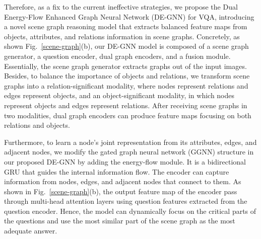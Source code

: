 \documentclass[letterpaper]{article} %
\begin{document}

Therefore, as a fix to the current ineffective strategies, we propose the Dual Energy-Flow Enhanced Graph Neural Network (DE-GNN) for VQA, introducing a novel scene graph reasoning model that extracts balanced feature maps from objects, attributes, and relations information in scene graphs. 
Concretely, as shown Fig.~\ref{scene-graph}(b), our DE-GNN model is composed of a scene graph generator, a question encoder, dual graph encoders, and a fusion module. 
Essentially, the scene graph generator extracts graphs out of the input images. 
Besides, to balance the importance of objects and relations, we transform scene graphs into a relation-significant modality, where nodes represent relations and edges represent objects, and an object-significant modality, in which nodes represent objects and edges represent relations. 
After receiving scene graphs in two modalities, dual graph encoders can produce feature maps focusing on both relations and objects.

Furthermore, to learn a node's joint representation from its attributes, edges, and adjacent nodes, we modify the gated graph neural network (GGNN) structure in our proposed DE-GNN by adding the energy-flow module. It is a bidirectional GRU that guides the internal information flow.
The encoder can capture information from nodes, edges, and adjacent nodes that connect to them. 
As shown in Fig.~\ref{scene-graph}(b), the output feature map of the encoder pass through multi-head attention layers using question features extracted from the question encoder. 
Hence, the model can dynamically focus on the critical parts of the questions and use the most similar part of the scene graph as the most adequate answer.
\end{document}
